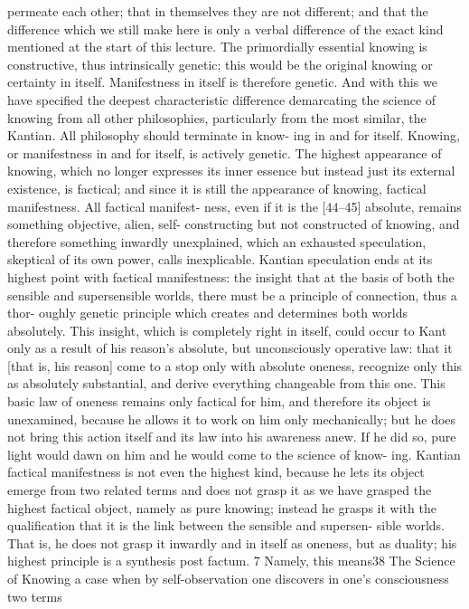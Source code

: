 permeate each other; that in themselves they are not different; and that the
difference which we still make here is only a verbal difference of the exact kind
mentioned at the start of this lecture. The primordially essential knowing is
constructive, thus intrinsically genetic; this would be the original knowing or
certainty in itself. Manifestness in itself is therefore genetic.
And with this we have specified the deepest characteristic difference
demarcating the science of knowing from all other philosophies, particularly
from the most similar, the Kantian. All philosophy should terminate in know-
ing in and for itself. Knowing, or manifestness in and for itself, is actively
genetic. The highest appearance of knowing, which no longer expresses its
inner essence but instead just its external existence, is factical; and since it is
still the appearance of knowing, factical manifestness. All factical manifest-
ness, even if it is the [44–45] absolute, remains something objective, alien, self-
constructing but not constructed of knowing, and therefore something
inwardly unexplained, which an exhausted speculation, skeptical of its own
power, calls inexplicable. Kantian speculation ends at its highest point with
factical manifestness: the insight that at the basis of both the sensible and
supersensible worlds, there must be a principle of connection, thus a thor-
oughly genetic principle which creates and determines both worlds absolutely.
This insight, which is completely right in itself, could occur to Kant only as a
result of his reason’s absolute, but unconsciously operative law: that it [that is,
his reason] come to a stop only with absolute oneness, recognize only this as
absolutely substantial, and derive everything changeable from this one. This
basic law of oneness remains only factical for him, and therefore its object is
unexamined, because he allows it to work on him only mechanically; but he
does not bring this action itself and its law into his awareness anew. If he did
so, pure light would dawn on him and he would come to the science of know-
ing. Kantian factical manifestness is not even the highest kind, because he lets
its object emerge from two related terms and does not grasp it as we have
grasped the highest factical object, namely as pure knowing; instead he grasps
it with the qualification that it is the link between the sensible and supersen-
sible worlds. That is, he does not grasp it inwardly and in itself as oneness, but
as duality; his highest principle is a synthesis post factum. 7 Namely, this means38
The Science of Knowing
a case when by self-observation one discovers in one’s consciousness two terms

